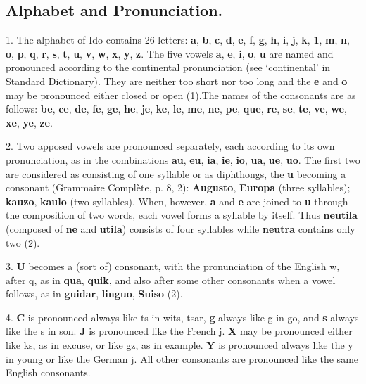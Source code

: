 \subsection*{Alphabet and Pronunciation.}
1. The alphabet of Ido contains 26 letters: \textbf{a}, \textbf{b}, \textbf{c}, \textbf{d}, \textbf{e}, \textbf{f}, \textbf{g}, \textbf{h}, \textbf{i}, \textbf{j}, \textbf{k}, \textbf{1}, \textbf{m}, \textbf{n}, \textbf{o}, \textbf{p}, \textbf{q}, \textbf{r}, \textbf{s}, \textbf{t}, \textbf{u}, \textbf{v}, \textbf{w}, \textbf{x}, \textbf{y}, \textbf{z}. The five vowels \textbf{a}, \textbf{e}, \textbf{i}, \textbf{o}, \textbf{u} are named and pronounced according to the continental pronunciation (see `continental' in Standard Dictionary). They are neither too short nor too long and the \textbf{e} and \textbf{o} may be pronounced either closed or open (1).\footnotemark[1] The names of the consonants are as follows: \textbf{be}, \textbf{ce}, \textbf{de}, \textbf{fe}, \textbf{ge}, \textbf{he}, \textbf{je}, \textbf{ke}, \textbf{le}, \textbf{me}, \textbf{ne}, \textbf{pe}, \textbf{que}, \textbf{re}, \textbf{se}, \textbf{te}, \textbf{ve}, \textbf{we}, \textbf{xe}, \textbf{ye}, \textbf{ze}.

2. Two apposed vowels are pronounced separately, each according to its own pronunciation, as in the combinations \textbf{au}, \textbf{eu}, \textbf{ia}, \textbf{ie}, \textbf{io}, \textbf{ua}, \textbf{ue}, \textbf{uo}. The first two are considered as consisting of one syllable or as diphthongs, the \textbf{u} becoming a consonant (Grammaire Complète, p. 8, 2): \textbf{Augusto}, \textbf{Europa} (three syllables); \textbf{kauzo}, \textbf{kaulo} (two syllables). When, however, \textbf{a} and \textbf{e} are joined to \textbf{u} through the composition of two words, each vowel forms a syllable by itself. Thus \textbf{neutila} (composed of \textbf{ne} and \textbf{utila}) consists of four syllables while \textbf{neutra} contains only two (2).

3. \textbf{U} becomes a (sort of) consonant, with the pronunciation of the English w, after q, as in \textbf{qua}, \textbf{quik}, and also after some other consonants when a vowel follows, as in \textbf{guidar}, \textbf{linguo}, \textbf{Suiso} (2). 
    
4. \textbf{C} is pronounced always like ts in wits, tsar, \textbf{g} always like g in go, and \textbf{s} always like the s in son. \textbf{J} is pronounced like the French j. \textbf{X} may be pronounced either like ks, as in excuse, or like gz, as in example. \textbf{Y} is pronounced always like the y in young or like the German j. All other consonants are pronounced like the same English consonants.
    
